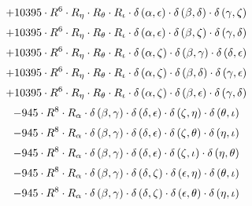 \begin{subequations}
\begin{gather}
 \\[0.2em] \notag 		 + 10395 \cdot R^{6} \cdot R_{\eta{}} \cdot R_{\theta{}} \cdot R_{\iota{}} \cdot \delta{}\left(\alpha{}, \epsilon{}\right) \cdot \delta{}\left(\beta{}, \delta{}\right) \cdot \delta{}\left(\gamma{}, \zeta{}\right) 
 \\[0.2em] \notag 		 + 10395 \cdot R^{6} \cdot R_{\eta{}} \cdot R_{\theta{}} \cdot R_{\iota{}} \cdot \delta{}\left(\alpha{}, \epsilon{}\right) \cdot \delta{}\left(\beta{}, \zeta{}\right) \cdot \delta{}\left(\gamma{}, \delta{}\right) 
 \\[0.2em] \notag 		 + 10395 \cdot R^{6} \cdot R_{\eta{}} \cdot R_{\theta{}} \cdot R_{\iota{}} \cdot \delta{}\left(\alpha{}, \zeta{}\right) \cdot \delta{}\left(\beta{}, \gamma{}\right) \cdot \delta{}\left(\delta{}, \epsilon{}\right) 
 \\[0.2em] \notag 		 + 10395 \cdot R^{6} \cdot R_{\eta{}} \cdot R_{\theta{}} \cdot R_{\iota{}} \cdot \delta{}\left(\alpha{}, \zeta{}\right) \cdot \delta{}\left(\beta{}, \delta{}\right) \cdot \delta{}\left(\gamma{}, \epsilon{}\right) 
 \\[0.2em] \notag 		 + 10395 \cdot R^{6} \cdot R_{\eta{}} \cdot R_{\theta{}} \cdot R_{\iota{}} \cdot \delta{}\left(\alpha{}, \zeta{}\right) \cdot \delta{}\left(\beta{}, \epsilon{}\right) \cdot \delta{}\left(\gamma{}, \delta{}\right) 
 \\[0.2em] \notag 		 - 945 \cdot R^{8} \cdot R_{\alpha{}} \cdot \delta{}\left(\beta{}, \gamma{}\right) \cdot \delta{}\left(\delta{}, \epsilon{}\right) \cdot \delta{}\left(\zeta{}, \eta{}\right) \cdot \delta{}\left(\theta{}, \iota{}\right) 
 \\[0.2em] \notag 		 - 945 \cdot R^{8} \cdot R_{\alpha{}} \cdot \delta{}\left(\beta{}, \gamma{}\right) \cdot \delta{}\left(\delta{}, \epsilon{}\right) \cdot \delta{}\left(\zeta{}, \theta{}\right) \cdot \delta{}\left(\eta{}, \iota{}\right) 
 \\[0.2em] \notag 		 - 945 \cdot R^{8} \cdot R_{\alpha{}} \cdot \delta{}\left(\beta{}, \gamma{}\right) \cdot \delta{}\left(\delta{}, \epsilon{}\right) \cdot \delta{}\left(\zeta{}, \iota{}\right) \cdot \delta{}\left(\eta{}, \theta{}\right) 
 \\[0.2em] \notag 		 - 945 \cdot R^{8} \cdot R_{\alpha{}} \cdot \delta{}\left(\beta{}, \gamma{}\right) \cdot \delta{}\left(\delta{}, \zeta{}\right) \cdot \delta{}\left(\epsilon{}, \eta{}\right) \cdot \delta{}\left(\theta{}, \iota{}\right) 
 \\[0.2em] \notag 		 - 945 \cdot R^{8} \cdot R_{\alpha{}} \cdot \delta{}\left(\beta{}, \gamma{}\right) \cdot \delta{}\left(\delta{}, \zeta{}\right) \cdot \delta{}\left(\epsilon{}, \theta{}\right) \cdot \delta{}\left(\eta{}, \iota{}\right) 

\end{gather}
\end{subequations}
